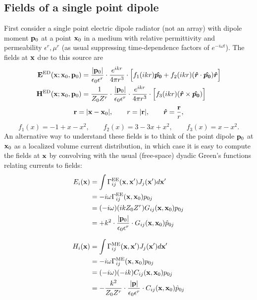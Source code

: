 \documentclass[letterpaper]{article}
\begin{document}
\subsection*{Fields of a single point dipole}

First consider a single point electric dipole radiator (not an array)
with dipole moment $\mathbf{p}_0$ at a point $\mathbf{x}_0$ in a
medium with relative permittivity and permeability
$\epsilon^r, \mu^r$
(as usual suppressing time-dependence factors
of $e^{-i\omega t}$). The fields at $\mathbf{x}$ due to this source are 
\begin{align*}
  \mathbf{E}^{\text{\scriptsize ED}}(\mathbf{x}; \mathbf{x}_0, \mathbf{p}_0)
   &= \frac{|\mathbf{p}_0|}{\epsilon_0 \epsilon^r}
      \cdot \frac{e^{ikr}}{4\pi r^3} \cdot 
      \Big[ f_1(ikr) \boldsymbol{\hat{p_0}} + f_2(ikr)(\boldsymbol{\hat{r}}\cdot \boldsymbol{\hat{p_0}})\boldsymbol{\hat{r}} \Big]
\\
  \mathbf{H}^{\text{\scriptsize ED}}(\mathbf{x}; \mathbf{x}_0, \mathbf{p}_0)
   &= \frac{1}{Z_0 Z^r }\cdot \frac{|\mathbf{p}_0|}{\epsilon_0 \epsilon^r}
      \cdot \frac{e^{ikr}}{4\pi r^3} \cdot 
      \Big[ f_3(ikr) (\boldsymbol{\hat{r}}\times\boldsymbol{\hat{p_0}})\Big]
\end{align*}
$$ \mathbf{r}=|\mathbf{x}-\mathbf{x}_0|, \qquad r=|\mathbf{r}|, \qquad \boldsymbol{\hat{r}}=\frac{\mathbf{r}}{r},$$
$$ f_1(x)=-1+x-x^2, \qquad f_2(x)=3-3x+x^2, \qquad f_3(x)=x-x^2.$$
An alternative way to understand these fields is to think of the point dipole
$\mathbf{p}_0$ at $\mathbf{x}_0$ as a localized volume current distribution, 
in which case it is easy to compute the fields at $\mathbf{x}$ by
convolving with the usual (free-space) dyadic
Green's functions relating currents to fields:
\begin{subequations}
\begin{align}
 E_i(\mathbf{x}) 
&= 
 \int \Gamma_{ij}^{\text{\scriptsize EE}}(\mathbf{x}, \mathbf{x}^\prime) J_j(\mathbf{x}^\prime) d\mathbf{x}^\prime
\nonumber\\
&=-i\omega \Gamma_{ij}^{\text{\scriptsize EE}}(\mathbf{x}, \mathbf{x}_0) p_{0j}
\nonumber\\
&=(-i\omega)(ikZ_0Z^r) G_{ij}(\mathbf{x}, \mathbf{x}_0) p_{0j}
\nonumber\\
&=+k^2 \cdot \frac{|\mathbf{p}_0|}{\epsilon_0 \epsilon^r } \cdot G_{ij}(\mathbf{x}, \mathbf{x}_0) \hat{p}_{0j}
\\[8pt]
H_i(\mathbf{x}) 
 &=
\int \Gamma_{ij}^{\text{\scriptsize ME}}(\mathbf{x}, \mathbf{x}^\prime) J_j(\mathbf{x}^\prime) d\mathbf{x}^\prime
\nonumber\\
&=-i\omega \Gamma_{ij}^{\text{\scriptsize ME}}(\mathbf{x}, \mathbf{x}_0) p_{0j}
\nonumber\\
&=(-i\omega)(-ik)  C_{ij}(\mathbf{x}, \mathbf{x}_0) p_{0j}
\nonumber\\
&=-\frac{k^2}{Z_0 Z^r} 
   \cdot 
   \frac{|\mathbf{p}|}{\epsilon_0 \epsilon^r}
   \cdot C_{ij}(\mathbf{x}, \mathbf{x}_0) \hat{p}_{0j}
\end{align}
\label{DipoleFieldsFromGC}
\end{subequations}
\end{document}
